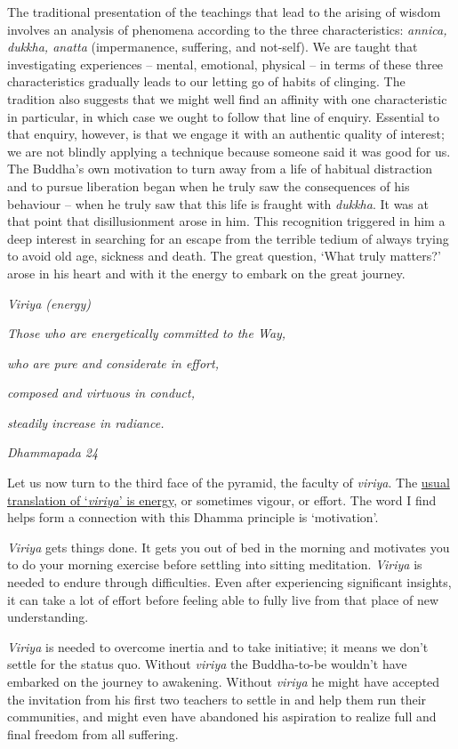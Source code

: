 The traditional presentation of the teachings that lead to the arising
of wisdom involves an analysis of phenomena according to the three
characteristics: \emph{annica, dukkha, anatta} (impermanence, suffering,
and not-self). We are taught that investigating experiences -- mental,
emotional, physical -- in terms of these three characteristics gradually
leads to our letting go of habits of clinging. The tradition also
suggests that we might well find an affinity with one characteristic in
particular, in which case we ought to follow that line of enquiry.
Essential to that enquiry, however, is that we engage it with an
authentic quality of interest; we are not blindly applying a technique
because someone said it was good for us. The Buddha's own motivation to
turn away from a life of habitual distraction and to pursue liberation
began when he truly saw the consequences of his behaviour -- when he
truly saw that this life is fraught with \emph{dukkha}. It was at that
point that disillusionment arose in him. This recognition triggered in
him a deep interest in searching for an escape from the terrible tedium
of always trying to avoid old age, sickness and death. The great
question, `What truly matters?' arose in his heart and with it the
energy to embark on the great journey.

\emph{Viriya (energy)}

\emph{Those who are energetically committed to the Way,}

\emph{who are pure and considerate in effort,}

\emph{composed and virtuous in conduct,}

\emph{steadily increase in radiance.}

\emph{Dhammapada 24}

Let us now turn to the third face of the pyramid, the faculty of
\emph{viriya}. The \underline{usual translation of `\emph{viriya}' is
energy}, or sometimes vigour, or effort. The word I find helps form a
connection with this Dhamma principle is `motivation'.

\emph{Viriya} gets things done. It gets you out of bed in the morning
and motivates you to do your morning exercise before settling into
sitting meditation. \emph{Viriya} is needed to endure through
difficulties. Even after experiencing significant insights, it can take
a lot of effort before feeling able to fully live from that place of new
understanding.

\emph{Viriya} is needed to overcome inertia and to take initiative; it
means we don't settle for the status quo. Without \emph{viriya} the
Buddha-to-be wouldn't have embarked on the journey to awakening. Without
\emph{viriya} he might have accepted the invitation from his first two
teachers to settle in and help them run their communities, and might
even have abandoned his aspiration to realize full and final freedom
from all suffering.

